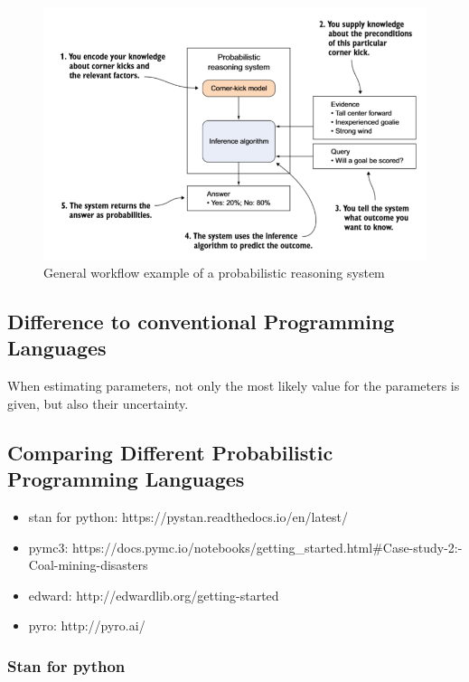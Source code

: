 \documentclass{article}
\begin{document}
\begin{figure}
	\includegraphics[width=\textwidth]{images/probabilistic_reasoning_system.PNG}
	\caption[General workflow example of a probabilistic reasoning system. Source: \cite{9781617292330}]{General workflow example of a probabilistic reasoning system}
	\label{fig:example_prs}
\end{figure}

\subsection{Difference to conventional Programming Languages}

When estimating parameters, not only the most likely value for the parameters is given, but also their uncertainty.

\subsection{Comparing Different Probabilistic Programming Languages}

\begin{itemize}
	\item stan for python: https://pystan.readthedocs.io/en/latest/
	\item pymc3: https://docs.pymc.io/notebooks/getting\_started.html\#Case-study-2:-Coal-mining-disasters
	\item edward: http://edwardlib.org/getting-started
	\item pyro: http://pyro.ai/
\end{itemize}

\subsubsection{Stan for python}
\end{document}
